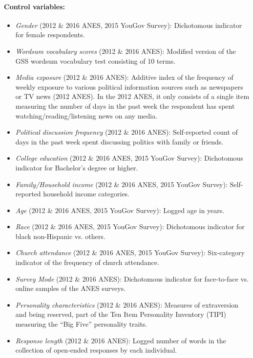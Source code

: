 \paragraph{Control variables:}
\begin{itemize}[nolistsep]
\item \textit{Gender} (2012 \& 2016 ANES, 2015 YouGov Survey): Dichotomous indicator for female respondents.
\item \textit{Wordsum vocabulary scores}  (2012 \& 2016 ANES): Modified version of the GSS wordsum vocabulary test consisting of 10 terms.
\item \textit{Media exposure} (2012 \& 2016 ANES): Additive index of the frequency of weekly exposure to various political information sources such as newspapers or TV news (2012 ANES). In the 2012 ANES, it only consists of a single item measuring the number of days in the past week the respondent has spent watching/reading/listening news on any media.
\item \textit{Political discussion frequency} (2012 \& 2016 ANES): Self-reported count of days in the past week spent discussing politics with family or friends.
\item \textit{College education} (2012 \& 2016 ANES, 2015 YouGov Survey): Dichotomous indicator for Bachelor's degree or higher.
\item \textit{Family/Household income} (2012 \& 2016 ANES, 2015 YouGov Survey): Self-reported household income categories.
\item \textit{Age} (2012 \& 2016 ANES, 2015 YouGov Survey): Logged age in years.
\item \textit{Race} (2012 \& 2016 ANES, 2015 YouGov Survey): Dichotomous indicator for black non-Hispanic vs. others.
\item \textit{Church attendance} (2012 \& 2016 ANES, 2015 YouGov Survey): Six-category indicator of the frequency of church attendance. 
\item \textit{Survey Mode} (2012 \& 2016 ANES): Dichotomous indicator for face-to-face vs. online samples of the ANES surveys.
\item \textit{Personality characteristics} (2012 \& 2016 ANES): Measures of extraversion and being reserved, part of the Ten Item Personality Inventory (TIPI) measuring the ``Big Five'' personality traits.
\item \textit{Response length} (2012 \& 2016 ANES): Logged number of words in the collection of open-ended responses by each individual.
\end{itemize}


